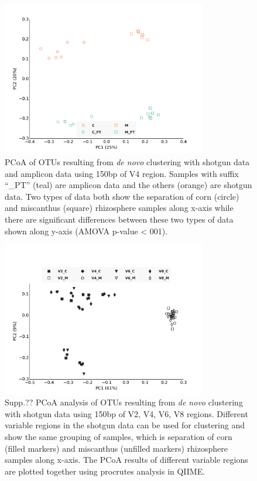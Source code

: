 \documentclass[12pt]{article}
\begin{document}
\begin{figure}[tbph!]
  \centering
  \includegraphics[width=0.8\textwidth]{figs/V4_SGvsPT_pcoa}
  \caption[PCoA of OTUs resulting from {\em de novo} clustering with shotgun data and amplicon data using 150bp of V4 region]{PCoA of OTUs resulting from {\em de novo} clustering with shotgun data and amplicon data using 150bp of V4 region. Samples with suffix ``\_PT'' (teal) are amplicon data and the others (orange) are shotgun data. Two types of data both show the separation of corn (circle) and miscanthus (square) rhizosphere samples along x-axis while there are significant differences between these two types of data shown along y-axis (AMOVA p-value < 001).}
  \label{fig:V4_SGvsPT_pcoa}
\end{figure}


\begin{figure}[tbph!]
  \centering
  \includegraphics[width=0.8\textwidth]{figs/compare_vregion}
  \caption[PCoA analysis of OTUs resulting from {\em de novo} clustering with shotgun data using 150bp of V2, V4, V6, V8 regions]{Supp.?? PCoA analysis of OTUs resulting from {\em de novo} clustering with shotgun data using 150bp of V2, V4, V6, V8 regions. Different variable regions in the shotgun data can be used for clustering and show the same grouping of samples, which is separation of corn (filled markers) and miscanthus (unfilled markers) rhizosphere samples along x-axis. The PCoA results of different variable regions are plotted together using procrutes analysis in QIIME.}
  \label{fig:compare_vregion}
\end{figure}
\end{document}
